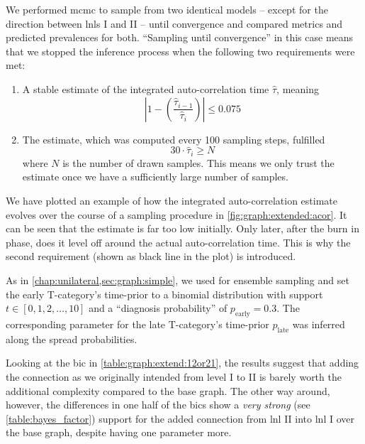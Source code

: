 \documentclass[\relativeRoot/main.tex]{subfiles}
\begin{document}
We performed \acrfull{mcmc} to sample from two identical models -- except for the direction between \glspl{lnl} I and II -- until convergence and compared metrics and predicted prevalences for both. ``Sampling until convergence'' in this case means that we stopped the inference process when the following two requirements were met:

\begin{enumerate}
    \item A stable estimate of the integrated auto-correlation time $\hat{\tau}$, meaning
    \begin{equation}
        \left| 1 - \left( \frac{\hat{\tau}_{i-1}}{\hat{\tau}_i} \right) \right| \leq 0.075
    \end{equation}
    \item The estimate, which was computed every 100 sampling steps, fulfilled
    \begin{equation}
        30 \cdot \hat{\tau}_i \geq N
    \end{equation}
    where $N$ is the number of drawn samples. This means we only trust the estimate once we have a sufficiently large number of samples.
\end{enumerate}

We have plotted an example of how the integrated auto-correlation estimate evolves over the course of a sampling procedure in \cref{fig:graph:extended:acor}. It can be seen that the estimate is far too low initially. Only later, after the burn in phase, does it level off around the actual auto-correlation time. This is why the second requirement (shown as black line in the plot) is introduced.

As in \cref{chap:unilateral,sec:graph:simple}, we used  for ensemble sampling and set the early T-category's time-prior to a binomial distribution with support $t \in [0, 1, 2, \ldots, 10]$ and a ``diagnosis probability'' of $p_\text{early} = 0.3$. The corresponding parameter for the late T-category's time-prior $p_\text{late}$ was inferred along the spread probabilities.

Looking at the \gls{bic} in \cref{table:graph:extend:12or21}, the results suggest that adding the connection as we originally intended from level I to II is barely worth the additional complexity compared to the base graph. The other way around, however, the differences in one half of the \glspl{bic} show a \emph{very strong} (see \cref{table:bayes_factor}) support for the added connection from \gls{lnl} II into \gls{lnl} I over the base graph, despite having one parameter more.
\end{document}
